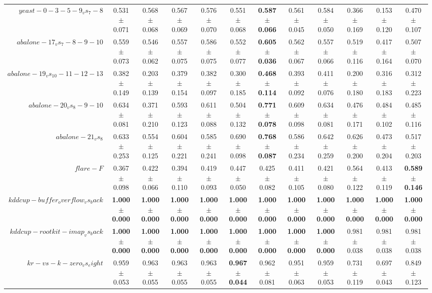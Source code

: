 \begin{table}[!ht]
{\begin{tabular}{r c c c c c c c c c c c}
$yeast-0-3-5-9_vs_7-8$ & 0.531 $\pm$ 0.071 & 0.568 $\pm$ 0.068 & 0.567 $\pm$ 0.069 & 0.576 $\pm$ 0.070 & 0.551 $\pm$ 0.068 & \textbf{0.587 $\pm$ 0.066} & 0.561 $\pm$ 0.045 & 0.584 $\pm$ 0.050 & 0.366 $\pm$ 0.169 & 0.153 $\pm$ 0.120 & 0.470 $\pm$ 0.107 \\
$abalone-17_vs_7-8-9-10$ & 0.559 $\pm$ 0.073 & 0.546 $\pm$ 0.062 & 0.557 $\pm$ 0.075 & 0.586 $\pm$ 0.075 & 0.552 $\pm$ 0.077 & \textbf{0.605 $\pm$ 0.036} & 0.562 $\pm$ 0.067 & 0.557 $\pm$ 0.066 & 0.519 $\pm$ 0.116 & 0.417 $\pm$ 0.164 & 0.507 $\pm$ 0.070 \\
$abalone-19_vs_10-11-12-13$ & 0.382 $\pm$ 0.149 & 0.203 $\pm$ 0.139 & 0.379 $\pm$ 0.154 & 0.382 $\pm$ 0.097 & 0.300 $\pm$ 0.185 & \textbf{0.468 $\pm$ 0.114} & 0.393 $\pm$ 0.092 & 0.411 $\pm$ 0.076 & 0.200 $\pm$ 0.180 & 0.316 $\pm$ 0.183 & 0.312 $\pm$ 0.223 \\
$abalone-20_vs_8-9-10$ & 0.634 $\pm$ 0.081 & 0.371 $\pm$ 0.210 & 0.593 $\pm$ 0.123 & 0.611 $\pm$ 0.088 & 0.504 $\pm$ 0.132 & \textbf{0.771 $\pm$ 0.078} & 0.609 $\pm$ 0.098 & 0.634 $\pm$ 0.081 & 0.476 $\pm$ 0.171 & 0.484 $\pm$ 0.102 & 0.485 $\pm$ 0.116 \\
$abalone-21_vs_8$ & 0.633 $\pm$ 0.253 & 0.554 $\pm$ 0.125 & 0.604 $\pm$ 0.221 & 0.585 $\pm$ 0.241 & 0.690 $\pm$ 0.098 & \textbf{0.768 $\pm$ 0.087} & 0.586 $\pm$ 0.234 & 0.642 $\pm$ 0.259 & 0.626 $\pm$ 0.200 & 0.473 $\pm$ 0.204 & 0.517 $\pm$ 0.203 \\
$flare-F$ & 0.367 $\pm$ 0.098 & 0.422 $\pm$ 0.066 & 0.394 $\pm$ 0.110 & 0.419 $\pm$ 0.093 & 0.447 $\pm$ 0.050 & 0.425 $\pm$ 0.082 & 0.411 $\pm$ 0.105 & 0.421 $\pm$ 0.080 & 0.564 $\pm$ 0.122 & 0.413 $\pm$ 0.119 & \textbf{0.589 $\pm$ 0.146} \\
$kddcup-buffer_overflow_vs_back$ & \textbf{1.000 $\pm$ 0.000} & \textbf{1.000 $\pm$ 0.000} & \textbf{1.000 $\pm$ 0.000} & \textbf{1.000 $\pm$ 0.000} & \textbf{1.000 $\pm$ 0.000} & \textbf{1.000 $\pm$ 0.000} & \textbf{1.000 $\pm$ 0.000} & \textbf{1.000 $\pm$ 0.000} & \textbf{1.000 $\pm$ 0.000} & \textbf{1.000 $\pm$ 0.000} & \textbf{1.000 $\pm$ 0.000} \\
$kddcup-rootkit-imap_vs_back$ & \textbf{1.000 $\pm$ 0.000} & \textbf{1.000 $\pm$ 0.000} & \textbf{1.000 $\pm$ 0.000} & \textbf{1.000 $\pm$ 0.000} & \textbf{1.000 $\pm$ 0.000} & \textbf{1.000 $\pm$ 0.000} & \textbf{1.000 $\pm$ 0.000} & \textbf{1.000 $\pm$ 0.000} & 0.981 $\pm$ 0.038 & 0.981 $\pm$ 0.038 & 0.981 $\pm$ 0.038 \\
$kr-vs-k-zero_vs_eight$ & 0.959 $\pm$ 0.053 & 0.963 $\pm$ 0.055 & 0.963 $\pm$ 0.055 & 0.963 $\pm$ 0.055 & \textbf{0.967 $\pm$ 0.044} & 0.962 $\pm$ 0.081 & 0.951 $\pm$ 0.063 & 0.959 $\pm$ 0.053 & 0.731 $\pm$ 0.119 & 0.697 $\pm$ 0.043 & 0.849 $\pm$ 0.123 \\

\end{tabular}}
\end{table}
